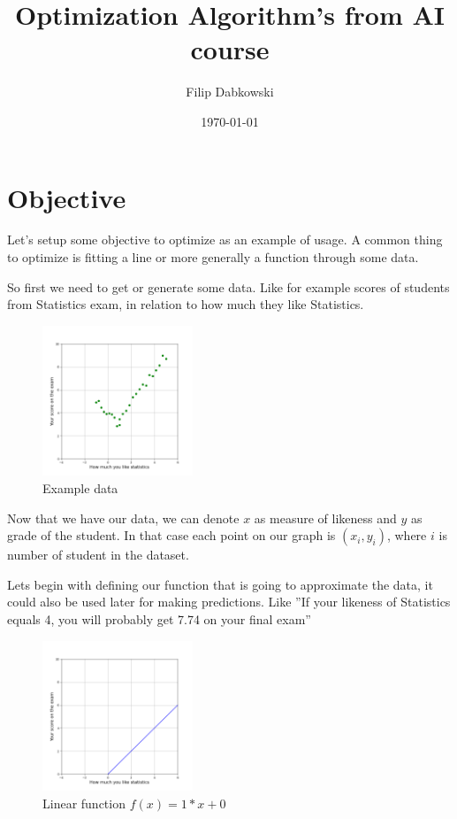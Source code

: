 \documentclass{article}
\title{Optimization Algorithm's from AI course}
\author{Filip Dabkowski}
\date{\today}
\begin{document}
\maketitle

\section{Objective}
Let's setup some objective to optimize as an example of usage. A common thing to optimize is fitting a line or more generally a function through some data.\newline

So first we need to get or generate some data. Like for example scores of students from Statistics exam, in relation to how much they like Statistics.
\begin{figure}[h]
    \centering
    \includegraphics[width=0.4\textwidth]{../images/myplot.png}
    \caption{Example data}
    \label{fig:data}
\end{figure}

Now that we have our data, we can denote $x$ as measure of likeness and $y$ as grade of the student. In that case each point on our graph is $(x_i, y_i)$, where $i$ is number of student in the dataset.

\break

Lets begin with defining our function that is going to approximate the data, it could also be used later for making predictions. Like ''If your likeness of Statistics equals 4, you will probably get 7.74 on your final exam''

\begin{figure}[h]
    \centering
    \includegraphics[width=0.4\textwidth]{../images/myplot1.png}
    \caption{Linear function $f(x) = 1 * x + 0$}
    \label{fig:data_line}
\end{figure}
\end{document}
